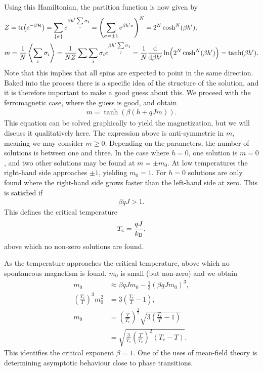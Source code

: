 Using this Hamiltonian, the partition function is now given by
\begin{align*}
	&Z = \tr(e^{-\beta\mathcal{H}}) = \sum\limits_{\{\sigma\}}e^{\beta h^{\prime}\sum\limits_{i}\sigma_{i}} = \left(\sum\limits_{\sigma = \pm 1}e^{\beta h^{\prime}\sigma}\right)^{N} = 2^{N}\cosh[N](\beta h^{\prime}), \\
	&m = \frac{1}{N}\expval{\sum\limits_{i}\sigma_{i}} = \frac{1}{NZ}\sum\sum\limits_{i}\sigma_{i}e^{\beta h^{\prime}\sum\limits_{j}\sigma_{j}} = \frac{1}{N}\dv{\beta h^{\prime}}\ln(2^{N}\cosh[N](\beta h^{\prime})) = \tanh(\beta h^{\prime}).
\end{align*}
Note that this implies that all spins are expected to point in the same direction. Baked into the process there is a specific idea of the structure of the solution, and it is therefore important to make a good guess about this. We proceed with the ferromagnetic case, where the guess is good, and obtain
\begin{align*}
	m = \tanh(\beta\left(h + qJm\right)).
\end{align*}
This equation can be solved graphically to yield the magnetization, but we will discuss it qualitatively here. The expression above is anti-symmetric in $m$, meaning we may consider $m \geq 0$. Depending on the parameters, the number of solutions is between one and three. In the case where $h = 0$, one solution is $m = 0$, and two other solutions may be found at $m = \pm m_{0}$. At low temperatures the right-hand side approaches $\pm 1$, yielding $m_{0} = 1$. For $h = 0$ solutions are only found where the right-hand side grows faster than the left-hand side at zero. This is satisfied if
\begin{align*}
	\beta qJ > 1.
\end{align*}
This defines the critical temperature
\begin{align*}
	T_{\text{c}} = \frac{qJ}{k_{\text{B}}},
\end{align*}
above which no non-zero solutions are found.

As the temperature approaches the critical temperature, above which no spontaneous magnetism is found, $m_{0}$ is small (but non-zero) and we obtain
\begin{align*}
	m_{0}                              &\approx \beta qJm_{0} - \frac{1}{3}\left(\beta qJm_{0}\right)^{3}, \\
	\left(\frac{T_{\text{c}}}{T}\right)^{3}m_{0}^{2} &= 3\left(\frac{T_{\text{c}}}{T} - 1\right), \\
	m_{0}                              &= \left(\frac{T}{T_{\text{c}}}\right)^{\frac{3}{2}}\sqrt{3\left(\frac{T_{\text{c}}}{T} - 1\right)} \\
	                                   &= \sqrt{\frac{3}{T_{\text{c}}}\left(\frac{T}{T_{\text{c}}}\right)^{2}\left(T_{\text{c}} - T\right)}.
\end{align*}
This identifies the critical exponent $\beta = 1$. One of the uses of mean-field theory is determining asymptotic behaviour close to phase transitions.

